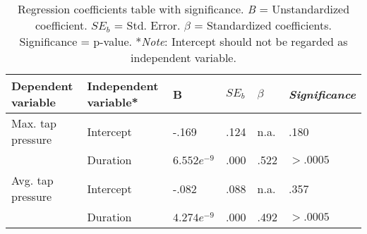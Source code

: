 \begin{table}[ht]
\centering
\begin{tabularx}{0.8\textwidth}{@{}llZZZZ@{}}
\textbf{Dependent variable} & \textbf{Independent variable*} & B             & $SE_b$ & $\beta$ & \textit{Significance} \\ \midrule
Max. tap pressure           & Intercept                      & -.169         & .124   & n.a.    & .180                  \\
                            & Duration                       & $6.552e^{-9}$ & .000   & .522    & $> .0005$             \\ \midrule
Avg. tap pressure           & Intercept                      & -.082         & .088   & n.a.    & .357                  \\
                            & Duration                       & $4.274e^{-9}$ & .000   & .492    & $> .0005$            
\end{tabularx}
\caption{Regression coefficients table with significance. \textit{B} = Unstandardized coefficient. \textit{$SE_b$} = Std. Error. \textit{$\beta$} = Standardized coefficients. Significance = p-value. *\textit{Note}: Intercept should not be regarded as independent variable.}
\label{tab:secondary_regression_coefficients}
\end{table}